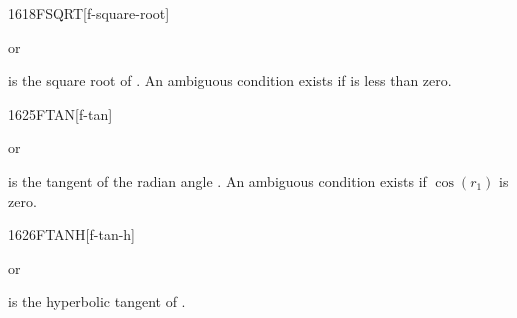 \begin{worddef}{1618}{FSQRT}[f-square-root]
\item {} or

	 is the square root of . An ambiguous
	condition exists if  is less than zero.
\end{worddef}


\begin{worddef}{1625}{FTAN}[f-tan]
\item {} or

	 is the tangent of the radian angle . An
	ambiguous condition exists if $\cos(r_1)$ is zero.
\end{worddef}


\begin{worddef}{1626}{FTANH}[f-tan-h]
\item {} or

	 is the hyperbolic tangent of .
\end{worddef}


